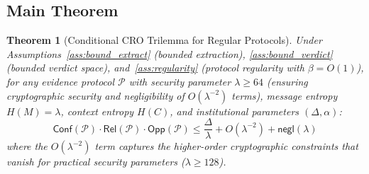 \documentclass{ieeeaccess}
\newcommand{\Conf}{\mathsf{Conf}}
\newcommand{\Rel}{\mathsf{Rel}}
\newcommand{\Opp}{\mathsf{Opp}}
\newcommand{\negl}{\mathsf{negl}}
\newtheorem{theorem}{Theorem}[subsection]
\begin{document}
\subsection{Main Theorem}

\begin{theorem}[Conditional CRO Trilemma for Regular Protocols]\label{thm:conditional_cro}
Under Assumptions~\ref{ass:bound_extract} (bounded extraction), \ref{ass:bound_verdict} (bounded verdict space), and~\ref{ass:regularity} (protocol regularity with $\beta = O(1)$), for any evidence protocol $\mathcal{P}$ with security parameter $\lambda \geq 64$ (ensuring cryptographic security and negligibility of $O(\lambda^{-2})$ terms), message entropy $H(M) = \lambda$, context entropy $H(C)$, and institutional parameters $(\Delta, \alpha)$:
\begin{equation}
\Conf(\mathcal{P}) \cdot \Rel(\mathcal{P}) \cdot \Opp(\mathcal{P}) 
    \leq \frac{\Delta}{\lambda} + O(\lambda^{-2}) + \negl(\lambda)
\end{equation}
where the $O(\lambda^{-2})$ term captures the higher-order cryptographic constraints that vanish for practical security parameters ($\lambda \geq 128$).
\end{theorem}
\end{document}
